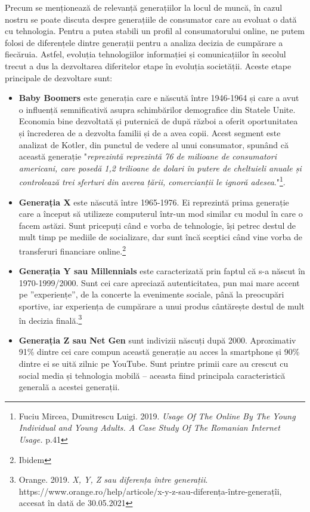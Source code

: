 \documentclass[a4paper, 12pt]{article}
\begin{document}
		\qquad Precum se menționează de relevanță generațiilor la locul de muncă, în cazul nostru se poate discuta despre generațiile de consumator care au evoluat o dată cu tehnologia. Pentru a putea stabili un profil al consumatorului online, ne putem folosi de diferențele dintre generații pentru a analiza decizia de cumpărare a fiecăruia. Astfel, evoluția tehnologiilor informației și comunicațiilor în secolul trecut a dus la dezvoltarea diferitelor etape în evoluția societății. Aceste etape principale de dezvoltare sunt:
		\begin{itemize}
		\item\textbf{Baby Boomers} este generația care e născută între 1946-1964 și care a avut o influență semnificativă asupra schimbărilor demografice din Statele Unite. Economia bine dezvoltată și puternică de după război a oferit oportunitatea și încrederea de a dezvolta familii și de a avea copii. Acest segment este analizat de Kotler, din punctul de vedere al unui consumator, spunând că această generație "\textit{reprezintă reprezintă 76 de milioane de consumatori americani, care posedă 1,2 trilioane de dolari în putere de cheltuieli anuale și controlează trei sferturi din averea țării, comercianții le ignoră adesea}."\footnote{Fuciu Mircea, Dumitrescu Luigi. 2019. \textit{Usage Of The Online By The Young Individual and Young Adults. A Case Study Of The Romanian Internet Usage.} p.41}.
		\item\textbf{Generația X} este născută între 1965-1976. Ei reprezintă prima generație care a început să utilizeze computerul într-un mod similar cu modul în care o facem astăzi. Sunt pricepuți când e vorba de tehnologie, își petrec destul de mult timp pe mediile de socializare, dar sunt încă sceptici când vine vorba de transferuri financiare online.\footnote{Ibidem}
		\item\textbf{Generația Y sau Millennials} este caracterizată prin faptul că s-a născut în 1970-1999/2000.  Sunt cei care apreciază autenticitatea, pun mai mare accent pe ”experiențe”, de la concerte la evenimente sociale, până la preocupări sportive, iar experiența de cumpărare a unui produs cântărește destul de mult în decizia finală.\footnote{Orange. 2019. \textit{X, Y, Z sau diferența între generații}. https://www.orange.ro/help/articole/x-y-z-sau-diferența-între-generațîi, accesat în dată de 30.05.2021}
		\item\textbf{Generația Z sau Net Gen} sunt indivizii născuți după 2000. Aproximativ 91\% dintre cei care compun această generație au acces la smartphone și 90\% dintre ei se uită zilnic pe YouTube. Sunt printre primii care au crescut cu social media și tehnologia mobilă – aceasta fiind principala caracteristică generală a acestei generații.
		\end{itemize}
\end{document}
